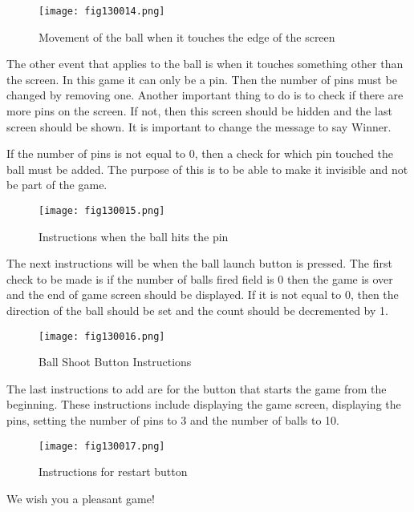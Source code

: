 \begin{figure}[H]
   \centering
   \texttt{[image: fig130014.png]}
   \caption{Movement of the ball when it touches the edge of the screen}
\label{fig130014}
\end{figure}

The other event that applies to the ball is when it touches something other than the screen. In this game it can only be a pin. Then the number of pins must be changed by removing one. Another important thing to do is to check if there are more pins on the screen. If not, then this screen should be hidden and the last screen should be shown. It is important to change the message to say Winner.

If the number of pins is not equal to 0, then a check for which pin touched the ball must be added. The purpose of this is to be able to make it invisible and not be part of the game.

\begin{figure}[H]
   \centering
   \texttt{[image: fig130015.png]}
   \caption{Instructions when the ball hits the pin}
\label{fig130015}
\end{figure}

The next instructions will be when the ball launch button is pressed. The first check to be made is if the number of balls fired field is 0 then the game is over and the end of game screen should be displayed. If it is not equal to 0, then the direction of the ball should be set and the count should be decremented by 1.

\begin{figure}[H]
   \centering
   \texttt{[image: fig130016.png]}
   \caption{Ball Shoot Button Instructions}
\label{fig130016}
\end{figure}

The last instructions to add are for the button that starts the game from the beginning. These instructions include displaying the game screen, displaying the pins, setting the number of pins to 3 and the number of balls to 10.

\begin{figure}[H]
   \centering
   \texttt{[image: fig130017.png]}
   \caption{Instructions for restart button}
\label{fig130017}
\end{figure}

We wish you a pleasant game!
